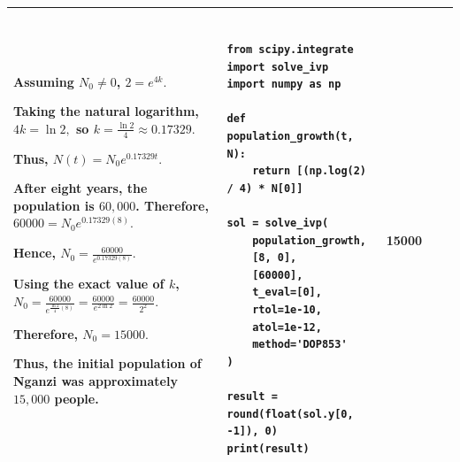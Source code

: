 \documentclass[a4paper,12pt]{article}
\begin{document}
\begin{longtable}{|p{0.3cm}|p{}|p{10cm}|p{}|p{1.5cm}|}
Assuming \(N_0\neq0\), $
2=e^{4k}.
$

Taking the natural logarithm, $
4k=\ln 2,
$ so $
k=\frac{\ln 2}{4}\approx0.17329.
$

Thus,  $
N(t)=N_0e^{0.17329t}.
$

After eight years, the population is \(60,000\). Therefore,
$
60000=N_0e^{0.17329(8)}.
$

Hence, $
N_0=\frac{60000}{e^{0.17329(8)}}.
$

Using the exact value of \(k\),
$
N_0
=\frac{60000}{e^{\frac{\ln 2}{4}(8)}}
=\frac{60000}{e^{2\ln 2}}
=\frac{60000}{2^2}.
$

Therefore, $
N_0=15000.
$

Thus, the initial population of Nganzi was approximately \(15,000\) people.

& 
\begin{verbatim}

from scipy.integrate import solve_ivp
import numpy as np

def population_growth(t, N):
    return [(np.log(2) / 4) * N[0]]

sol = solve_ivp(
    population_growth,
    [8, 0],
    [60000],
    t_eval=[0],
    rtol=1e-10,
    atol=1e-12,
    method='DOP853'
)

result = round(float(sol.y[0, -1]), 0)
print(result)

\end{verbatim}& 15000               \\ \hline
  
\end{longtable}
\end{document}
